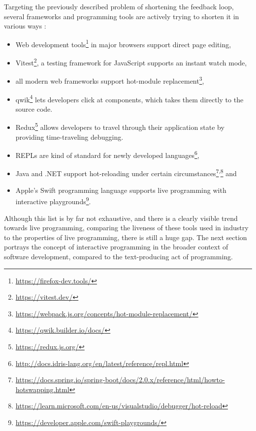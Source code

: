 Targeting the previously described problem of shortening the feedback loop, several frameworks and programming tools are actively trying to shorten it in various ways \cite{kubelka_road_2018}:
\begin{itemize}
  \item Web development tools\footnote{\url{https://firefox-dev.tools/}} in major browsers support direct page editing,
  \item Vitest\footnote{\url{https://vitest.dev/}}, a testing framework for JavaScript supports an instant watch mode,
  \item all modern web frameworks support hot-module replacement\footnote{\url{https://webpack.js.org/concepts/hot-module-replacement/}},
  \item qwik\footnote{\url{https://qwik.builder.io/docs/}} lets developers click at components, which takes them directly to the source code.
  \item Redux\footnote{\url{https://redux.js.org/}} allows developers to travel through their application state by providing time-traveling debugging.
  \item REPLs are kind of standard for newly developed languages\footnote{\url{http://docs.idris-lang.org/en/latest/reference/repl.html}},
  \item Java and .NET support hot-reloading under certain circumstances\footnote{\url{https://docs.spring.io/spring-boot/docs/2.0.x/reference/html/howto-hotswapping.html}}\textsuperscript{,}\footnote{\url{https://learn.microsoft.com/en-us/visualstudio/debugger/hot-reload}} and
  \item Apple's Swift programming language supports live programming with interactive playgrounds\footnote{\url{https://developer.apple.com/swift-playgrounds/}}.
\end{itemize}
    
Although this list is by far not exhaustive, and there is a clearly visible trend towards live programming, comparing the liveness of these tools used in industry to the properties of live programming, there is still a huge gap.
The next section portrays the concept of interactive programming in the broader context of software development, compared to the text-producing act of programming.



